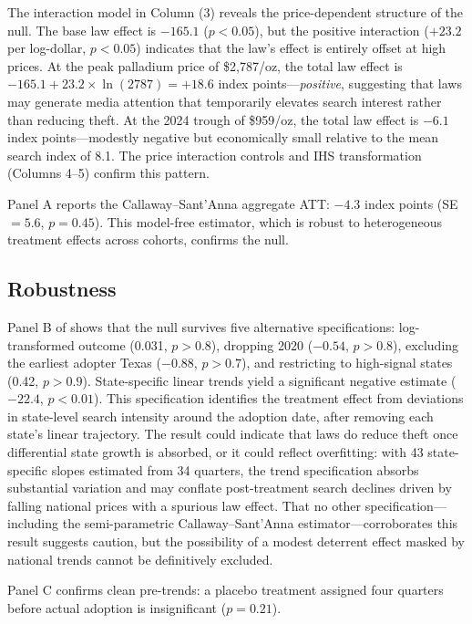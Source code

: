 \documentclass[12pt]{article}
\begin{document}
The interaction model in Column (3) reveals the price-dependent structure of the null. The base law effect is $-165.1$ ($p < 0.05$), but the positive interaction ($+23.2$ per log-dollar, $p < 0.05$) indicates that the law's effect is entirely offset at high prices. At the peak palladium price of \$2,787/oz, the total law effect is $-165.1 + 23.2 \times \ln(2787) = +18.6$ index points---\textit{positive}, suggesting that laws may generate media attention that temporarily elevates search interest rather than reducing theft. At the 2024 trough of \$959/oz, the total law effect is $-6.1$ index points---modestly negative but economically small relative to the mean search index of 8.1. The price interaction controls and IHS transformation (Columns 4--5) confirm this pattern.

 Panel A reports the Callaway--Sant'Anna aggregate ATT: $-4.3$ index points (SE $= 5.6$, $p = 0.45$). This model-free estimator, which is robust to heterogeneous treatment effects across cohorts, confirms the null.

\subsection{Robustness}



Panel B of  shows that the null survives five alternative specifications: log-transformed outcome (0.031, $p > 0.8$), dropping 2020 ($-0.54$, $p > 0.8$), excluding the earliest adopter Texas ($-0.88$, $p > 0.7$), and restricting to high-signal states (0.42, $p > 0.9$). State-specific linear trends yield a significant negative estimate ($-22.4$, $p < 0.01$). This specification identifies the treatment effect from deviations in state-level search intensity around the adoption date, after removing each state's linear trajectory. The result could indicate that laws do reduce theft once differential state growth is absorbed, or it could reflect overfitting: with 43 state-specific slopes estimated from 34 quarters, the trend specification absorbs substantial variation and may conflate post-treatment search declines driven by falling national prices with a spurious law effect. That no other specification---including the semi-parametric Callaway--Sant'Anna estimator---corroborates this result suggests caution, but the possibility of a modest deterrent effect masked by national trends cannot be definitively excluded.

Panel C confirms clean pre-trends: a placebo treatment assigned four quarters before actual adoption is insignificant ($p = 0.21$).
\end{document}
